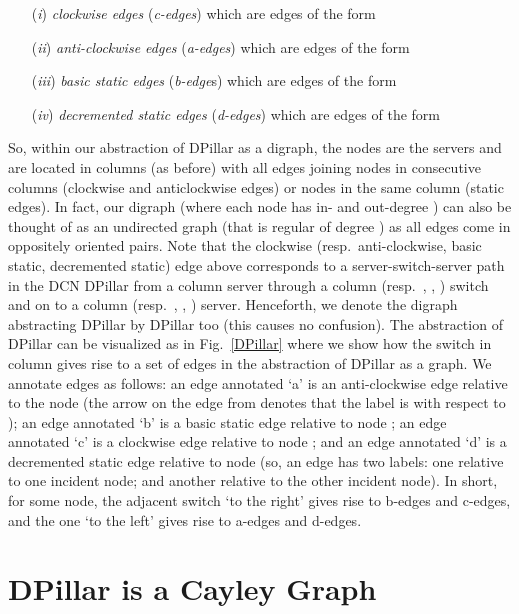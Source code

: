 \documentclass{article}
\begin{document}
\begin{itemize}
\item[(\emph{i\/})] \emph{clockwise edges\/} (\emph{c-edges\/}) which are edges of the form 
  
\item[(\emph{ii\/})] \emph{anti-clockwise edges\/} (\emph{a-edges\/}) which are edges of the form 
  
\item[(\emph{iii\/})] \emph{basic static edges\/} (\emph{b-edge\/}s) which are edges of the form 
  
\item [(\emph{iv\/})] \emph{decremented static edges\/} (\emph{d-edges\/}) which are edges of the form
  
\end{itemize}
So, within our abstraction of DPillar as a digraph, the nodes are the
servers and are located in columns  (as before) with all edges
joining nodes in consecutive columns (clockwise and anticlockwise edges) or
nodes in the same column (static edges). In fact, our digraph (where each node
has in- and out-degree ) can also be thought of as an undirected graph
(that is regular of degree ) as all edges come in oppositely oriented
pairs. Note that the clockwise (resp.\ anti-clockwise, basic static, decremented
static) edge above corresponds to a server-switch-server path in the DCN
DPillar from a column  server through a column  (resp.\ , ,
) switch and on to a column  (resp.\ , , ) server.
Henceforth, we denote the digraph abstracting DPillar by DPillar
too (this causes no confusion). The abstraction of DPillar can be visualized as
in Fig.~\ref{DPillar} where we show how the switch  in column  gives rise
to a set of edges in the abstraction of DPillar as a graph. We annotate edges as
follows: an edge annotated `a' is an anti-clockwise edge relative to the node
 (the arrow on the edge from  denotes that the label is with
respect to ); an edge annotated `b' is a basic static edge relative to
node ; an edge annotated `c' is a clockwise edge relative to node
; and an edge annotated `d' is a decremented static edge relative to
node  (so, an edge has two labels: one relative to one incident node;
and another relative to the other incident node). In short, for some node, the
adjacent switch `to the right' gives rise to b-edges and c-edges, and the one
`to the left' gives rise to a-edges and d-edges.

\section{DPillar is a Cayley Graph}\label{sec:Cayley}
\end{document}
